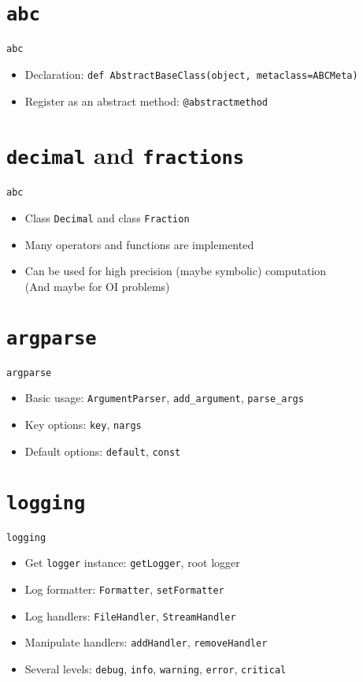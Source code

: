 \documentclass[xcolor=table]{mysld}
\begin{document}
\section{\texttt{abc}}
\begin{frame}[fragile]{\texttt{abc}}
\begin{itemize}
\item Declaration: \verb"def AbstractBaseClass(object, metaclass=ABCMeta)"
\item Register as an abstract method: \verb"@abstractmethod"
\end{itemize}
\end{frame}

\section{\texttt{decimal} and \texttt{fractions}}
\begin{frame}[fragile]{\texttt{abc}}
\begin{itemize}
\item Class \verb"Decimal" and class \verb"Fraction"
\item Many operators and functions are implemented
\item Can be used for high precision (maybe symbolic) computation \\
(And maybe for OI problems)
\end{itemize}
\end{frame}

\section{\texttt{argparse}}
\begin{frame}[fragile]{\texttt{argparse}}
\begin{itemize}
\item Basic usage: \verb"ArgumentParser", \verb"add_argument", \verb"parse_args"
\item Key options: \verb"key", \verb"nargs"
\item Default options: \verb"default", \verb"const"
\end{itemize}
\end{frame}

\section{\texttt{logging}}
\begin{frame}[fragile]{\texttt{logging}}
\begin{itemize}
\item Get \verb"logger" instance: \verb"getLogger", root logger
\item Log formatter: \verb"Formatter", \verb"setFormatter"
\item Log handlers: \verb"FileHandler", \verb"StreamHandler"
\item Manipulate handlers: \verb"addHandler", \verb"removeHandler"
\item Several levels: \verb"debug", \verb"info", \verb"warning", \verb"error", \verb"critical"
\end{itemize}
\end{frame}
\end{document}
